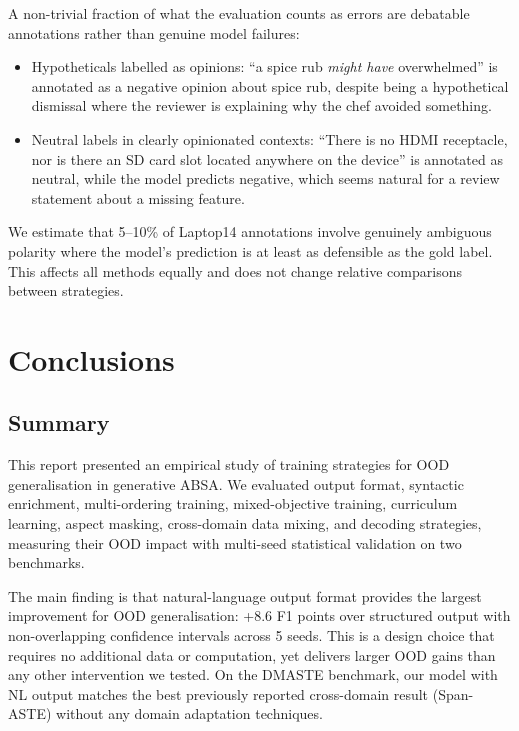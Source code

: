 \documentclass[12pt,a4paper]{report}
\begin{document}
A non-trivial fraction of what the evaluation counts as errors are debatable annotations rather than genuine model failures:

\begin{itemize}
    \item Hypotheticals labelled as opinions: ``a spice rub \textit{might have} overwhelmed'' is annotated as a negative opinion about spice rub, despite being a hypothetical dismissal where the reviewer is explaining why the chef avoided something.
    \item Neutral labels in clearly opinionated contexts: ``There is no HDMI receptacle, nor is there an SD card slot located anywhere on the device'' is annotated as neutral, while the model predicts negative, which seems natural for a review statement about a missing feature.
\end{itemize}

We estimate that 5--10\% of Laptop14 annotations involve genuinely ambiguous polarity where the model's prediction is at least as defensible as the gold label. This affects all methods equally and does not change relative comparisons between strategies.



\chapter{Conclusions}\label{ch:conclusions}

\section{Summary}

This report presented an empirical study of training strategies for OOD generalisation in generative ABSA. We evaluated output format, syntactic enrichment, multi-ordering training, mixed-objective training, curriculum learning, aspect masking, cross-domain data mixing, and decoding strategies, measuring their OOD impact with multi-seed statistical validation on two benchmarks.

The main finding is that natural-language output format provides the largest improvement for OOD generalisation: +8.6 F1 points over structured output with non-overlapping confidence intervals across 5 seeds. This is a design choice that requires no additional data or computation, yet delivers larger OOD gains than any other intervention we tested. On the DMASTE benchmark, our model with NL output matches the best previously reported cross-domain result (Span-ASTE) without any domain adaptation techniques.
\end{document}
